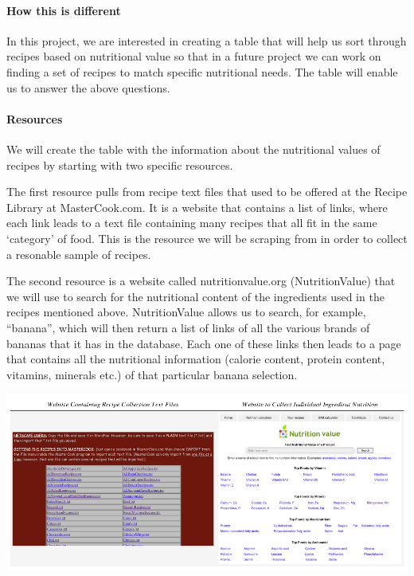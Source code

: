 \documentclass[11pt]{article}
\makeatletter
\def\maxwidth{\ifdim\Gin@nat@width>\linewidth\linewidth
    \else\Gin@nat@width\fi}
\let\Oldincludegraphics\includegraphics
\renewcommand{\includegraphics}[1]{\Oldincludegraphics[width=.8\maxwidth]{#1}}
\makeatother
\begin{document}
    \hypertarget{how-this-is-different}{%
\paragraph{How this is different}\label{how-this-is-different}}

In this project, we are interested in creating a table that will help us
sort through recipes based on nutritional value so that in a future
project we can work on finding a set of recipes to match specific
nutritional needs. The table will enable us to answer the above
questions.

\hypertarget{resources}{%
\paragraph{Resources}\label{resources}}

We will create the table with the information about the nutritional
values of recipes by starting with two specific resources.

The first resource pulls from recipe text files that used to be offered
at the Recipe Library at MasterCook.com. It is a website that contains a
list of links, where each link leads to a text file containing many
recipes that all fit in the same `category' of food. This is the
resource we will be scraping from in order to collect a resonable sample
of recipes.

The second resource is a website called nutritionvalue.org
(NutritionValue) that we will use to search for the nutritional content
of the ingredients used in the recipes mentioned above. NutritionValue
allows us to search, for example, ``banana'', which will then return a
list of links of all the various brands of bananas that it has in the
database. Each one of these links then leads to a page that contains all
the nutritional information (calorie content, protein content, vitamins,
minerals etc.) of that particular banana selection.

\includegraphics{websites.png}
\end{document}

